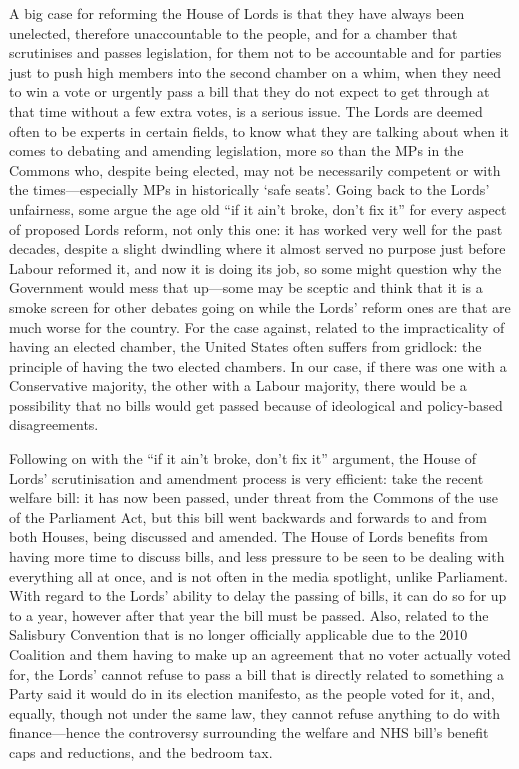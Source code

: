 \documentclass[a4paper]{article}
\begin{document}
A big case for reforming the House of Lords is that they have always been unelected, therefore unaccountable to the people, and for a chamber that scrutinises and passes legislation, for them not to be accountable and for parties just to push high members into the second chamber on a whim, when they need to win a vote or urgently pass a bill that they do not expect to get through at that time without a few extra votes, is a serious issue.  The Lords are deemed often to be experts in certain fields, to know what they are talking about when it comes to debating and amending legislation, more so than the MPs in the Commons who, despite being elected, may not be necessarily competent or with the times---especially MPs in historically `safe seats'.  Going back to the Lords' unfairness, some argue the age old ``if it ain't broke, don't fix it'' for every aspect of proposed Lords reform, not only this one: it has worked very well for the past decades, despite a slight dwindling where it almost served no purpose just before Labour reformed it, and now it is doing its job, so some might question why the Government would mess that up---some may be sceptic and think that it is a smoke screen for other debates going on while the Lords' reform ones are that are much worse for the country.  For the case against, related to the impracticality of having an elected chamber, the United States often suffers from gridlock: the principle of having the two elected chambers.  In our case, if there was one with a Conservative majority, the other with a Labour majority, there would be a possibility that no bills would get passed because of ideological and policy-based disagreements.

Following on with the ``if it ain't broke, don't fix it'' argument, the House of Lords' scrutinisation and amendment process is very efficient: take the recent welfare bill: it has now been passed, under threat from the Commons of the use of the Parliament Act, but this bill went backwards and forwards to and from both Houses, being discussed and amended.  The House of Lords benefits from having more time to discuss bills, and less pressure to be seen to be dealing with everything all at once, and is not often in the media spotlight, unlike Parliament.  With regard to the Lords' ability to delay the passing of bills, it can do so for up to a year, however after that year the bill must be passed.  Also, related to the Salisbury Convention that is no longer officially applicable due to the 2010 Coalition and them having to make up an agreement that no voter actually voted for, the Lords' cannot refuse to pass a bill that is directly related to something a Party said it would do in its election manifesto, as the people voted for it, and, equally, though not under the same law, they cannot refuse anything to do with finance---hence the controversy surrounding the welfare and NHS bill's benefit caps and reductions, and the bedroom tax. 
\end{document}
